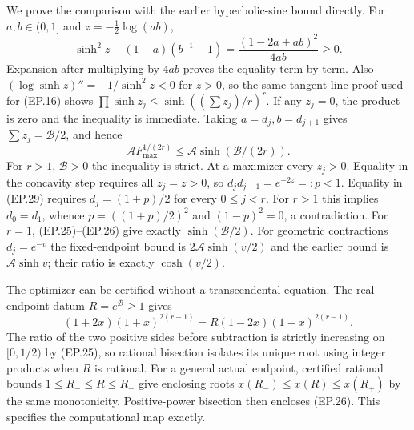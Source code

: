 \documentclass[11pt]{article}
\begin{document}
We prove the comparison with the earlier hyperbolic-sine bound directly.
For $a,b\in(0,1]$ and $z=-\tfrac12\log(ab)$,
\[
 \sinh^2z-(1-a)(b^{-1}-1)
 =\frac{(1-2a+ab)^2}{4ab}\ge0.\tag{EP.29}
\]
Expansion after multiplying by $4ab$ proves the equality term by
term. Also $(\log\sinh z)''=-1/\sinh^2z<0$ for $z>0$,
so the same tangent-line proof used for (EP.16) shows
$\prod\sinh z_j\le\sinh((\sum z_j)/r)^r$.
If any $z_j=0$, the product is zero and the inequality is immediate.
Taking $a=d_j,b=d_{j+1}$ gives $\sum z_j=\mathcal B/2$,
and hence
\[
 \mathcal A F_{\max}^{1/(2r)}
 \le\mathcal A\sinh(\mathcal B/(2r)).\tag{EP.30}
\]
For $r>1$, $\mathcal B>0$ the inequality is strict. At a maximizer
every $z_j>0$. Equality in the concavity step requires all $z_j=z>0$,
so $d_jd_{j+1}=e^{-2z}=:p<1$. Equality in (EP.29) requires
$d_j=(1+p)/2$ for every $0\le j<r$. For $r>1$ this implies
$d_0=d_1$, whence $p=((1+p)/2)^2$ and $(1-p)^2=0$, a contradiction.
For $r=1$, (EP.25)--(EP.26) give exactly $\sinh(\mathcal B/2)$.
For geometric contractions $d_j=e^{-v}$ the fixed-endpoint bound
is $2\mathcal A\sinh(v/2)$ and the earlier bound is
$\mathcal A\sinh v$; their ratio is exactly $\cosh(v/2)$.

The optimizer can be certified without a transcendental equation.
The real endpoint datum $R=e^{\mathcal B}\ge1$ gives
\[
 (1+2x)(1+x)^{2(r-1)}
       =R(1-2x)(1-x)^{2(r-1)}.\tag{EP.31}
\]
The ratio of the two positive sides before subtraction is strictly
increasing on $[0,1/2)$ by (EP.25), so rational bisection isolates
its unique root using integer products when $R$ is rational. For a
general actual endpoint, certified rational bounds
$1\le R_-\le R\le R_+$ give enclosing roots
$x(R_-)\le x(R)\le x(R_+)$ by the same monotonicity. Positive-power bisection
then encloses (EP.26). This specifies the computational map exactly.
\end{document}
